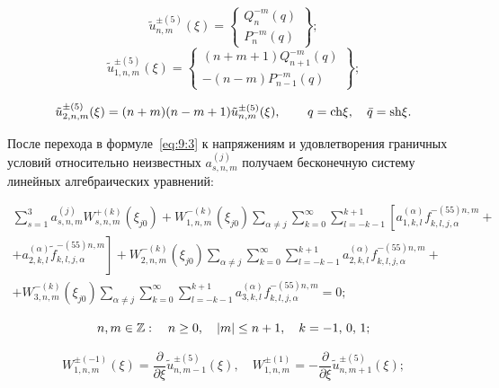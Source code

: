 \begin{equation}
\tilde u_{n,m}^{ \pm (5)}(\xi ) = \left\{ \begin{array}{l}
Q_n^{ - m}(q)\\
P_n^{ - m}(q)
\end{array} \right\};
\end{equation}
\begin{equation}
\tilde u_{1,n,m}^{ \pm (5)}(\xi ) = \left\{ \begin{array}{l}
(n + m + 1)Q_{n + 1}^{ - m}(q)\\
 - (n - m)P_{n - 1}^{ - m}(q)
\end{array} \right\};
\end{equation}

\begin{equation}
\tilde u_{2,n,m}^{ \pm (5)}(\xi ) = (n + m)(n - m + 1)\tilde u_{n,m}^{ \pm (5)}(\xi ),\qquad {\kern 1pt} q = {\mathop{\rm ch}\nolimits} \xi ,\quad \bar q = {\mathop{\rm sh}\nolimits} \xi.
\end{equation}

После перехода в формуле~\eqref{eq:9:3} к напряжениям и удовлетворения граничных условий относительно неизвестных $a_{s,n,m}^{(j)}$ получаем бесконечную систему линейных алгебраических уравнений:

\begin{multline}
\sum\limits_{s = 1}^3 {a_{s,n,m}^{(j)}} W_{s,n,m}^{ + (k)}({\xi _{j0}}) + W_{1,n,m}^{ - (k)}({\xi _{j0}})\sum\limits_{\alpha  \ne j} {\sum\limits_{k = 0}^\infty  {\sum\limits_{l =  - k - 1}^{k + 1} {\left[ {a_{1,k,l}^{(\alpha )}f_{k,l,j,\alpha }^{ - (55)n,m} + } \right.} } } \\
\left. { + a_{2,k,l}^{(\alpha )}\tilde f_{k,l,j,\alpha }^{ - (55)n,m}} \right] + W_{2,n,m}^{ - (k)}({\xi _{j0}})\sum\limits_{\alpha  \ne j} {\sum\limits_{k = 0}^\infty  {\sum\limits_{l =  - k - 1}^{k + 1} {a_{2,k,l}^{(\alpha )}} } f_{k,l,j,\alpha }^{ - (55)n,m} + } \\
+ W_{3,n,m}^{ - (k)}({\xi _{j0}})\sum\limits_{\alpha  \ne j} {\sum\limits_{k = 0}^\infty  {\sum\limits_{l =  - k - 1}^{k + 1} {a_{3,k,l}^{(\alpha )}} } f_{k,l,j,\alpha }^{ - (55)n,m} = 0;}
\label{eq:9:24}
\end{multline}

$$
n,m \in\mathbb{Z}:\quad n \ge 0,\quad |m| \le n + 1,\quad k =  - 1,{\mkern 1mu} {\kern 1pt} 0,{\mkern 1mu} {\kern 1pt} 1;
$$

\begin{equation}
W_{1,n,m}^{ \pm ( - 1)}(\xi ) = \frac{\partial }{{\partial \xi }}\tilde u_{n,m - 1}^{ \pm (5)}(\xi ),\quad W_{1,n,m}^{ \pm (1)} =  - \frac{\partial }{{\partial \xi }}\tilde u_{n,m + 1}^{ \pm (5)}(\xi );
\label{eq:9:15}
\end{equation}

